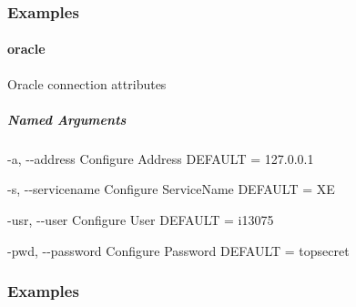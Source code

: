 \documentclass[letterpaper,10pt,english,openany,oneside]{sphinxmanual}
\begin{document}
\subsubsection{Examples}
\begin{sphinxVerbatim}[commandchars=\\\{\}]
        
\end{sphinxVerbatim}

\paragraph{oracle}
\label{\detokenize{cmd_main:oracle}}
Oracle connection attributes

\begin{sphinxVerbatim}[commandchars=\\\{\}]
   \PYG{p}{[}\PYG{p}{]} \PYG{p}{[} \PYG{p}{]} \PYG{p}{[} \PYG{p}{]} \PYG{p}{[} \PYG{p}{]}
                    \PYG{p}{[} \PYG{p}{]}
\end{sphinxVerbatim}


\subparagraph{Named Arguments}
\label{\detokenize{cmd_main:Named Arguments_repeat12}}\begin{optionlist}{3cm}
\item [-a, -{-}address]  
Configure Address DEFAULT = 127.0.0.1
\item [-s, -{-}servicename]  
Configure ServiceName DEFAULT = XE
\item [-usr, -{-}user]  
Configure User DEFAULT = i13075
\item [-pwd, -{-}password]  
Configure Password DEFAULT = topsecret
\end{optionlist}

\subsubsection{Examples}
\begin{sphinxVerbatim}[commandchars=\\\{\}]
           
\end{sphinxVerbatim}
\end{document}
